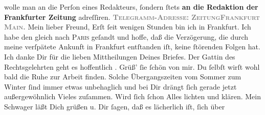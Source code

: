 {\begin{ledgroupsized}[t]{13cm}
{{{{{{{                                    wolle man  an die Perſon eines
                                    Redakteurs, ſondern ſtets \textbf{an die Redaktion der
                                          Frankfurter Zeitung} adreſſiren}.}}}}}}\pend
           \pstart
           \textcolor{gray}{\textbf{\textsc{Telegramm-Adreſſe:}}}\pend
           \pstart
           \textcolor{gray}{\textbf{\textsc{ZeitungFrankfurt Main.}}}\pend
           \pstart\center{}Mein lieber Freund,\pend\pstart
           Erſt ſeit wenigen Stunden bin ich in Frankfurt.
               Ich habe den \label{K_L02823-1v}\label{K_L02823-1h} gleich nach \textsc{Paris} geſandt und hoffe, daß die Verzögerung, die
               durch meine verſpätete Ankunft in Frankfurt
               entſtanden iſt, keine ſtörenden Folgen hat.\pend
           \pstart
           Ich danke Dir für die lieben Mittheilungen Deines Briefes. Der Gattin des Rechtsgelehrten geht es hoffentlich \label{K_L02823-2v}\label{K_L02823-2h}. Grüß’ ſie ſchön von mir.\pend
           \pstart
           Du ſelbſt wirſt  wohl bald die \strikeout{\textcolor{gray}{R}} Ruhe zur Arbeit {\pb}finden. Solche Übergangszeiten vom Sommer zum Winter
               ſind immer etwas unbehaglich und bei Dir drängt ſich gerade jetzt außergewöhnlich
               Vieles zuſammen. Wird ſich ſchon Alles lichten und klären.\pend
           \pstart
           Mein Schwager läßt Dich
               grüßen u. Dir ſagen, daß es lächerlich iſt, ſich über \label{K_L02823-3v}
\end{ledgroupsized}}
